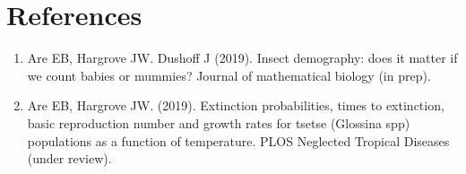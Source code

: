\documentclass[10pt,a4paper]{article}
\begin{document}
\section*{References}
\begin{enumerate} 
\item 	Are EB, Hargrove JW. Dushoff J (2019). Insect demography: does it matter if we count babies or mummies? Journal of mathematical biology (in prep).

\item 	Are EB, Hargrove JW. (2019). Extinction probabilities, times to extinction, basic reproduction number and growth rates for tsetse (Glossina spp) populations as a function of temperature. PLOS Neglected Tropical Diseases  (under review).


\end{enumerate}
\end{document}
